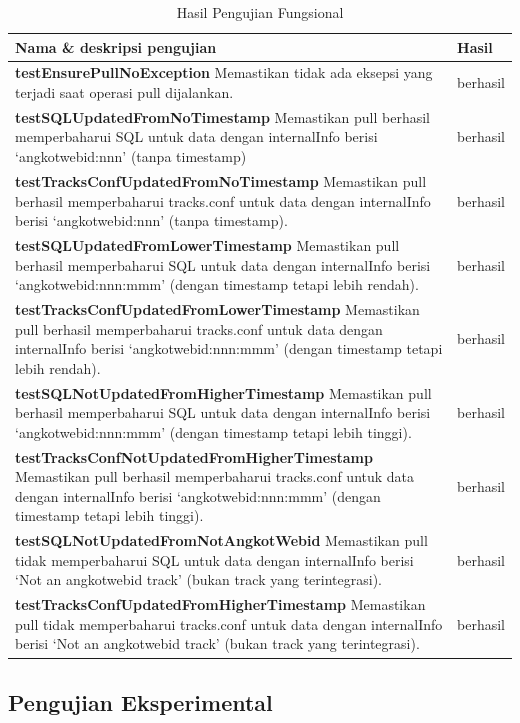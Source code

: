 \begin{table}
	\caption{Hasil Pengujian Fungsional}
	\label{tab:5_hasil_pengujian_fungsional}
	\begin{tabular}{|p{12.5cm}|p{2.5cm}|}
		\hline
		Nama \& deskripsi pengujian & Hasil \\
		\hline
		\textbf{testEnsurePullNoException} Memastikan tidak ada eksepsi yang terjadi saat operasi pull dijalankan. & berhasil \\
		\textbf{testSQLUpdatedFromNoTimestamp} Memastikan pull berhasil memperbaharui SQL untuk data dengan internalInfo berisi `angkotwebid:nnn' (tanpa timestamp) & berhasil \\
		\textbf{testTracksConfUpdatedFromNoTimestamp} Memastikan pull berhasil memperbaharui tracks.conf untuk data dengan internalInfo berisi `angkotwebid:nnn' (tanpa timestamp). & berhasil \\
		\textbf{testSQLUpdatedFromLowerTimestamp} Memastikan pull berhasil memperbaharui SQL untuk data dengan internalInfo berisi `angkotwebid:nnn:mmm' (dengan timestamp tetapi lebih rendah). & berhasil \\
		\textbf{testTracksConfUpdatedFromLowerTimestamp} Memastikan pull berhasil memperbaharui tracks.conf untuk data dengan internalInfo berisi `angkotwebid:nnn:mmm' (dengan timestamp tetapi lebih rendah). & berhasil \\
		\textbf{testSQLNotUpdatedFromHigherTimestamp} Memastikan pull berhasil memperbaharui SQL untuk data dengan internalInfo berisi `angkotwebid:nnn:mmm' (dengan timestamp tetapi lebih tinggi). & berhasil \\
		\textbf{testTracksConfNotUpdatedFromHigherTimestamp} Memastikan pull berhasil memperbaharui tracks.conf untuk data dengan internalInfo berisi `angkotwebid:nnn:mmm' (dengan timestamp tetapi lebih tinggi). & berhasil \\
		\textbf{testSQLNotUpdatedFromNotAngkotWebid} Memastikan pull tidak memperbaharui SQL untuk data dengan internalInfo berisi `Not an angkotwebid track' (bukan track yang terintegrasi). & berhasil \\
		\textbf{testTracksConfUpdatedFromHigherTimestamp} Memastikan pull tidak memperbaharui tracks.conf untuk data dengan internalInfo berisi `Not an angkotwebid track' (bukan track yang terintegrasi). & berhasil \\
		\hline
	\end{tabular}
\end{table}

\subsection{Pengujian Eksperimental}

